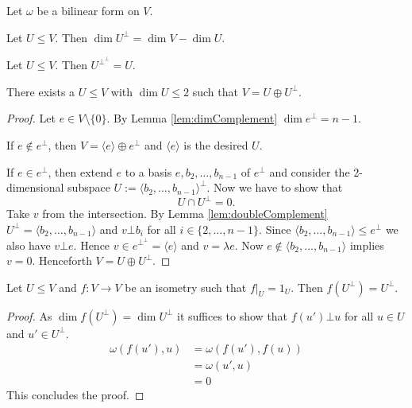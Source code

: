 Let $\omega$ be a bilinear form on $V$.

\begin{lemma}\label{lem:dimComplement}
Let $U\leq V$. Then $\dim U^\bot= \dim V-\dim U$.
\end{lemma}
\begin{lemma}\label{lem:doubleComplement}
Let $U\leq V$. Then $U^{\bot^\bot}=U$.
\end{lemma}

\begin{lemma}\label{lem:decompositionComplement}
There exists a $U\leq V$ with $\dim U\leq 2$ such that $V=U\oplus U^\bot$.
\end{lemma}
\begin{proof}
Let $e\in V\setminus\{0\}$. By Lemma \ref{lem:dimComplement} $\dim e^\bot= n-1$. %

If $e\notin e^\bot$, then $V=\langle e\rangle\oplus e^\bot$ and $\langle e\rangle$ is the desired $U$.

If $e\in e^\bot$, then extend $e$ to a basis $e,b_2,\dots,b_{n-1}$ of $e^\bot$ and consider the 2-dimensional subspace $U:=\langle b_2,\dots,b_{n-1}\rangle^\bot$. Now we have to show that \[U\cap U^\bot=0.\]
Take $v$ from the intersection. By Lemma \ref{lem:doubleComplement} $U^\bot=\langle b_2,\dots,b_{n-1}\rangle$ and $v\bot b_i$ for all $i\in\{2,\dots,n-1\}$. Since $\langle b_2,\dots,b_{n-1}\rangle\leq e^\bot$ we also have $v\bot e$. Hence $v\in e^{\bot^\bot}=\langle e\rangle$ and $v=\lambda e$. Now $e\notin \langle b_2,\dots,b_{n-1}\rangle$ implies $v=0$. Henceforth $V=U\oplus U^\bot$.
\end{proof}


\begin{lemma}\label{lem:isomStaysInCompl}
Let $U\leq V$ and $f\colon V\to V$ be an isometry such that $f|_U=1_U$. Then $f(U^\bot)= U^\bot$.
\end{lemma}
\begin{proof}
As $\dim f(U^\bot)=\dim U^\bot$ it suffices to show that $f(u')\bot u$ for all $u\in U$ and $u'\in U^\bot$.
\begin{align*}
\omega(f(u'),u)&=\omega(f(u'),f(u))\\
&=\omega(u',u)\\
&=0
\end{align*}
This concludes the proof.
\end{proof}

